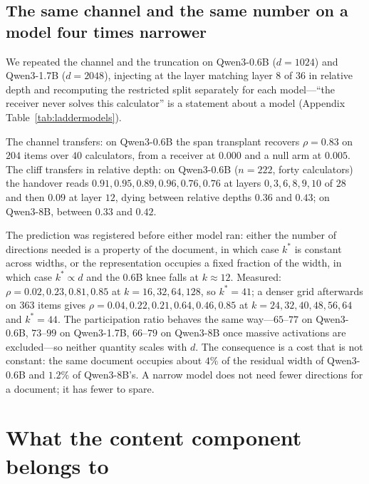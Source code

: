 \documentclass{article}
\begin{document}
\subsection{The same channel and the same number on a model four times narrower}
\label{sec:ladder}

We repeated the channel and the truncation on Qwen3-0.6B ($d=1024$) and
Qwen3-1.7B ($d=2048$), injecting at the layer matching layer $8$ of $36$ in
relative depth and recomputing the restricted split separately for each
model---``the receiver never solves this calculator'' is a statement about a
model (Appendix Table~\ref{tab:laddermodels}).

The channel transfers: on Qwen3-0.6B the span transplant recovers
$\rho = 0.83$ on $204$ items over $40$ calculators, from a receiver at $0.000$
and a null arm at $0.005$. The cliff transfers in relative depth: on Qwen3-0.6B
($n=222$, forty calculators) the handover reads
$0.91, 0.95, 0.89, 0.96, 0.76, 0.76$ at layers $0,3,6,8,9,10$ of $28$ and then
$0.09$ at layer $12$, dying between relative depths $0.36$ and $0.43$; on
Qwen3-8B, between $0.33$ and $0.42$.

The prediction was registered before either model ran: either the number of
directions needed is a property of the document, in which case $k^{*}$ is
constant across widths, or the representation occupies a fixed fraction of the
width, in which case $k^{*}\propto d$ and the $0.6$B knee falls at $k\approx12$.
Measured: $\rho = 0.02, 0.23, 0.81, 0.85$ at $k = 16, 32, 64, 128$, so
$k^{*}=41$; a denser grid afterwards on $363$ items gives
$\rho = 0.04, 0.22, 0.21, 0.64, 0.46, 0.85$ at $k = 24,32,40,48,56,64$ and
$k^{*}=44$. The participation ratio behaves the same way---$65$--$77$ on
Qwen3-0.6B, $73$--$99$ on Qwen3-1.7B, $66$--$79$ on Qwen3-8B once massive
activations are excluded---so neither quantity scales with $d$. The consequence
is a cost that is not constant: the same document occupies about $4\%$ of the
residual width of Qwen3-0.6B and $1.2\%$ of Qwen3-8B's. A narrow model does not
need fewer directions for a document; it has fewer to spare.



\section{What the content component belongs to}
\label{sec:whose}
\end{document}
